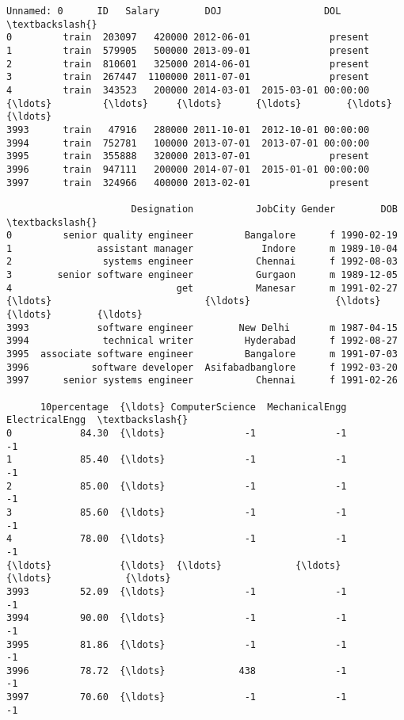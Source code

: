 \documentclass[11pt]{article}
\makeatletter
\newcommand{\boxspacing}{\kern\kvtcb@left@rule\kern\kvtcb@boxsep}
\newcommand{\prompt}[4]{
        \ttfamily\llap{{\color{#2}[#3]:\hspace{3pt}#4}}\vspace{-\baselineskip}
    }
\makeatother
\begin{document}
            \begin{tcolorbox}[breakable, size=fbox, boxrule=.5pt, pad at break*=1mm, opacityfill=0]
\prompt{Out}{outcolor}{3}{\boxspacing}
\begin{Verbatim}[commandchars=\\\{\}]
     Unnamed: 0      ID   Salary        DOJ                  DOL  \textbackslash{}
0         train  203097   420000 2012-06-01              present
1         train  579905   500000 2013-09-01              present
2         train  810601   325000 2014-06-01              present
3         train  267447  1100000 2011-07-01              present
4         train  343523   200000 2014-03-01  2015-03-01 00:00:00
{\ldots}         {\ldots}     {\ldots}      {\ldots}        {\ldots}                  {\ldots}
3993      train   47916   280000 2011-10-01  2012-10-01 00:00:00
3994      train  752781   100000 2013-07-01  2013-07-01 00:00:00
3995      train  355888   320000 2013-07-01              present
3996      train  947111   200000 2014-07-01  2015-01-01 00:00:00
3997      train  324966   400000 2013-02-01              present

                      Designation           JobCity Gender        DOB  \textbackslash{}
0         senior quality engineer         Bangalore      f 1990-02-19
1               assistant manager            Indore      m 1989-10-04
2                systems engineer           Chennai      f 1992-08-03
3        senior software engineer           Gurgaon      m 1989-12-05
4                             get           Manesar      m 1991-02-27
{\ldots}                           {\ldots}               {\ldots}    {\ldots}        {\ldots}
3993            software engineer        New Delhi       m 1987-04-15
3994             technical writer         Hyderabad      f 1992-08-27
3995  associate software engineer         Bangalore      m 1991-07-03
3996           software developer  Asifabadbanglore      f 1992-03-20
3997      senior systems engineer           Chennai      f 1991-02-26

      10percentage  {\ldots} ComputerScience  MechanicalEngg  ElectricalEngg  \textbackslash{}
0            84.30  {\ldots}              -1              -1              -1
1            85.40  {\ldots}              -1              -1              -1
2            85.00  {\ldots}              -1              -1              -1
3            85.60  {\ldots}              -1              -1              -1
4            78.00  {\ldots}              -1              -1              -1
{\ldots}            {\ldots}  {\ldots}             {\ldots}             {\ldots}             {\ldots}
3993         52.09  {\ldots}              -1              -1              -1
3994         90.00  {\ldots}              -1              -1              -1
3995         81.86  {\ldots}              -1              -1              -1
3996         78.72  {\ldots}             438              -1              -1
3997         70.60  {\ldots}              -1              -1              -1


\end{Verbatim}
\end{tcolorbox}
\end{document}

